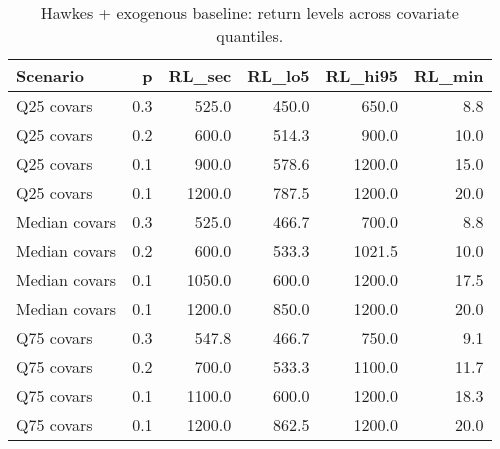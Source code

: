 \begin{table}
\caption{Hawkes + exogenous baseline: return levels across covariate quantiles.}
\label{tab:hawkes_exog_rl}
\begin{tabular}{lrrrrr}
\toprule
Scenario & p & RL_sec & RL_lo5 & RL_hi95 & RL_min \\
\midrule
Q25 covars & 0.3 & 525.0 & 450.0 & 650.0 & 8.8 \\
Q25 covars & 0.2 & 600.0 & 514.3 & 900.0 & 10.0 \\
Q25 covars & 0.1 & 900.0 & 578.6 & 1200.0 & 15.0 \\
Q25 covars & 0.1 & 1200.0 & 787.5 & 1200.0 & 20.0 \\
Median covars & 0.3 & 525.0 & 466.7 & 700.0 & 8.8 \\
Median covars & 0.2 & 600.0 & 533.3 & 1021.5 & 10.0 \\
Median covars & 0.1 & 1050.0 & 600.0 & 1200.0 & 17.5 \\
Median covars & 0.1 & 1200.0 & 850.0 & 1200.0 & 20.0 \\
Q75 covars & 0.3 & 547.8 & 466.7 & 750.0 & 9.1 \\
Q75 covars & 0.2 & 700.0 & 533.3 & 1100.0 & 11.7 \\
Q75 covars & 0.1 & 1100.0 & 600.0 & 1200.0 & 18.3 \\
Q75 covars & 0.1 & 1200.0 & 862.5 & 1200.0 & 20.0 \\
\bottomrule
\end{tabular}
\end{table}
